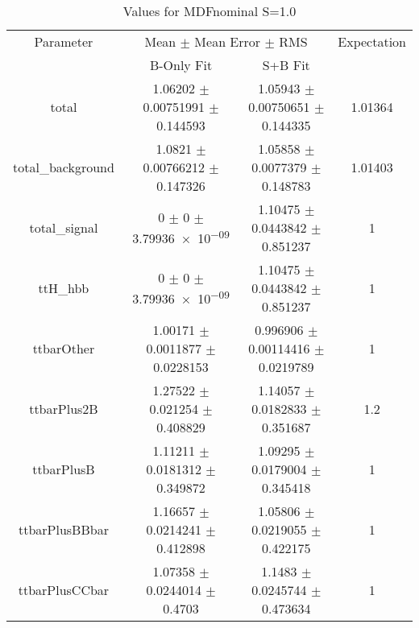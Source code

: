 \begin{table}
\centering
\caption{Values for MDFnominal S=1.0}
\begin{tabular}{cccc}
\toprule
Parameter & \multicolumn{2}{c}{Mean $\pm$ Mean Error $\pm$ RMS} & Expectation\\
 & B-Only Fit & S+B Fit & \\
\midrule
total & \num{1.06202} $\pm$ \num{0.00751991} $\pm$ \num{0.144593} & \num{1.05943} $\pm$ \num{0.00750651} $\pm$ \num{0.144335} & \num{1.01364}\\
total\_background & \num{1.0821} $\pm$ \num{0.00766212} $\pm$ \num{0.147326} & \num{1.05858} $\pm$ \num{0.0077379} $\pm$ \num{0.148783} & \num{1.01403}\\
total\_signal & \num{0} $\pm$ \num{0} $\pm$ \num{3.79936e-09} & \num{1.10475} $\pm$ \num{0.0443842} $\pm$ \num{0.851237} & \num{1}\\
ttH\_hbb & \num{0} $\pm$ \num{0} $\pm$ \num{3.79936e-09} & \num{1.10475} $\pm$ \num{0.0443842} $\pm$ \num{0.851237} & \num{1}\\
ttbarOther & \num{1.00171} $\pm$ \num{0.0011877} $\pm$ \num{0.0228153} & \num{0.996906} $\pm$ \num{0.00114416} $\pm$ \num{0.0219789} & \num{1}\\
ttbarPlus2B & \num{1.27522} $\pm$ \num{0.021254} $\pm$ \num{0.408829} & \num{1.14057} $\pm$ \num{0.0182833} $\pm$ \num{0.351687} & \num{1.2}\\
ttbarPlusB & \num{1.11211} $\pm$ \num{0.0181312} $\pm$ \num{0.349872} & \num{1.09295} $\pm$ \num{0.0179004} $\pm$ \num{0.345418} & \num{1}\\
ttbarPlusBBbar & \num{1.16657} $\pm$ \num{0.0214241} $\pm$ \num{0.412898} & \num{1.05806} $\pm$ \num{0.0219055} $\pm$ \num{0.422175} & \num{1}\\
ttbarPlusCCbar & \num{1.07358} $\pm$ \num{0.0244014} $\pm$ \num{0.4703} & \num{1.1483} $\pm$ \num{0.0245744} $\pm$ \num{0.473634} & \num{1}\\
\bottomrule
\end{tabular}
\end{table}